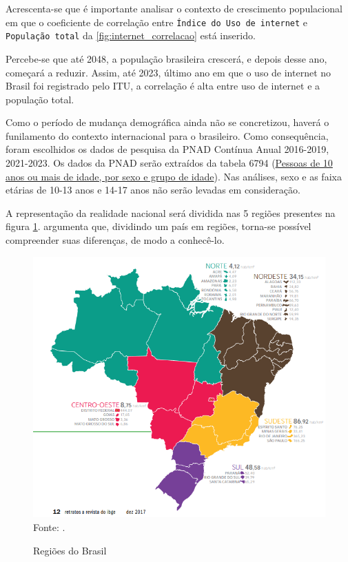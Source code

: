 Acrescenta-se que é importante analisar o contexto de crescimento populacional em que o coeficiente de correlação entre \texttt{Índice do Uso de internet} e \texttt{População total} da \ref{fig:internet_correlacao} está inserido. 

Percebe-se que até 2048, a população brasileira crescerá, e depois desse ano, começará a reduzir. Assim, até 2023, último ano em que o uso de internet no Brasil foi registrado pelo ITU, a correlação é alta entre uso de internet e a população total.

Como o período de mudança demográfica ainda não se concretizou, haverá o funilamento do contexto internacional para o brasileiro. Como consequência, foram escolhidos os dados de pesquisa da PNAD Contínua Anual 2016-2019, 2021-2023. Os dados da PNAD serão extraídos da tabela 6794 (\href{Htps://sidra.ibge.gov.br/tabela/6794}{Pessoas de 10 anos ou mais de idade, por sexo e grupo de idade}). Nas análises, sexo e as faixa etárias de 10-13 anos e 14-17 anos não serão levadas em consideração.

A representação da realidade nacional será dividida nas 5 regiões presentes na figura \ref{fig:regioes_brasil}. \cite{HAMAM_2017} argumenta que, dividindo um país em regiões, torna-se possível compreender suas diferenças, de modo a conhecê-lo.

\begin{figure}[H]
    \centering
    \caption{Regiões do Brasil}
    \includegraphics[width=0.75\linewidth]{figuras/regioes/regioes_brasil.PNG}
    \label{fig:regioes_brasil}
    \\ \footnotesize{Fonte: \cite{HAMAM_2017}.}
\end{figure}

